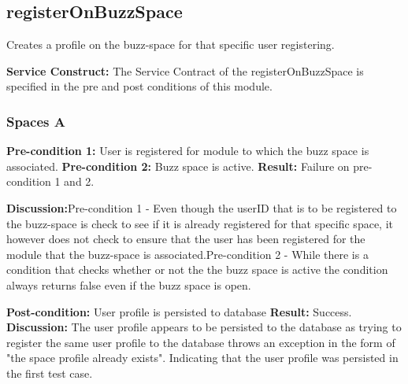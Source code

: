 
\newpage
\subsection{registerOnBuzzSpace}

Creates a profile on the buzz-space for that specific user registering.

\textbf{Service Construct:}  The Service Contract of the registerOnBuzzSpace is specified in the pre and post conditions of this module.	
  				   \newline

\subsubsection{Spaces A}
\textbf{Pre-condition 1:}  User is registered for module to which the buzz space is associated. \newline
\textbf{Pre-condition 2:}  Buzz space is active.\newline
\textbf{Result:} Failure on pre-condition 1 and 2.\newline\newline

\textbf{Discussion:}Pre-condition 1 -  Even though the userID that is to be registered to the buzz-space is check to see if it is already registered for that specific space, it however does not check to ensure that the user has been registered for the module that the buzz-space is associated.Pre-condition 2 - While there is a condition that checks whether or not the the buzz space is active the condition always returns false even if the buzz space is open. 
\newline \newline

\textbf{Post-condition:} User profile is persisted to database \newline
\textbf{Result:} Success.\newline\newline
\textbf{Discussion:} The user profile appears to be persisted to the database as trying to register the same user profile to the database throws an exception in the form of "the space profile already exists". Indicating that the user profile was persisted in the first test case.
\newline \newline